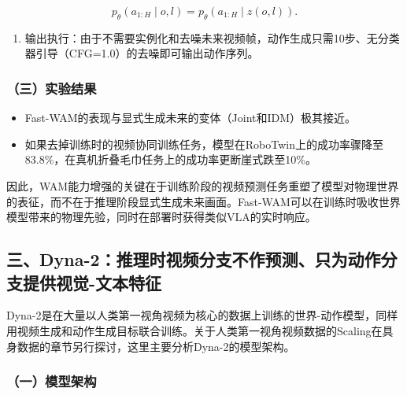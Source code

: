 \[
p_\theta(a_{1:H}\mid o,l)=p_\theta(a_{1:H}\mid z(o,l)).
\]

\begin{enumerate}
\def\labelenumi{\arabic{enumi}.}
\setcounter{enumi}{2}
\tightlist
\item
  输出执行：由于不需要实例化和去噪未来视频帧，动作生成只需10步、无分类器引导（CFG=1.0）的去噪即可输出动作序列。
\end{enumerate}

\hypertarget{ux4e09ux5b9eux9a8cux7ed3ux679c}{%
\subsubsection{（三）实验结果}\label{ux4e09ux5b9eux9a8cux7ed3ux679c}}

\begin{itemize}
\tightlist
\item
  Fast-WAM的表现与显式生成未来的变体（Joint和IDM）极其接近。
\item
  如果去掉训练时的视频协同训练任务，模型在RoboTwin上的成功率骤降至83.8\%，在真机折叠毛巾任务上的成功率更断崖式跌至10\%。
\end{itemize}

因此，WAM能力增强的关键在于训练阶段的视频预测任务重塑了模型对物理世界的表征，而不在于推理阶段显式生成未来画面。Fast-WAM可以在训练时吸收世界模型带来的物理先验，同时在部署时获得类似VLA的实时响应。

\hypertarget{ux4e09dyna-2ux63a8ux7406ux65f6ux89c6ux9891ux5206ux652fux4e0dux4f5cux9884ux6d4bux53eaux4e3aux52a8ux4f5cux5206ux652fux63d0ux4f9bux89c6ux89c9-ux6587ux672cux7279ux5f81}{%
\subsection{三、Dyna-2：推理时视频分支不作预测、只为动作分支提供视觉-文本特征}\label{ux4e09dyna-2ux63a8ux7406ux65f6ux89c6ux9891ux5206ux652fux4e0dux4f5cux9884ux6d4bux53eaux4e3aux52a8ux4f5cux5206ux652fux63d0ux4f9bux89c6ux89c9-ux6587ux672cux7279ux5f81}}

Dyna-2是在大量以人类第一视角视频为核心的数据上训练的世界-动作模型，同样用视频生成和动作生成目标联合训练。关于人类第一视角视频数据的Scaling在具身数据的章节另行探讨，这里主要分析Dyna-2的模型架构。

\hypertarget{ux4e00ux6a21ux578bux67b6ux6784-2}{%
\subsubsection{（一）模型架构}\label{ux4e00ux6a21ux578bux67b6ux6784-2}}

